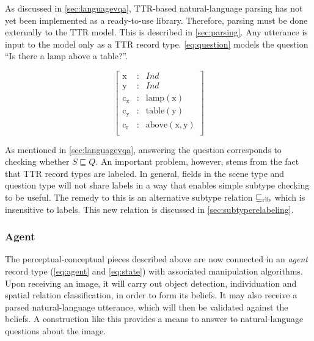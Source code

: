 
As discussed in \autoref{sec:languagevqa}, TTR-based natural-language parsing has not yet been implemented as a ready-to-use library.
Therefore, parsing must be done externally to the TTR model.
This is described in \autoref{sec:parsing}.
Any utterance is input to the model only as a TTR record type.
\autoref{eq:question} models the question ``Is there a lamp above a table?''.

\begin{equation}\label{eq:question}
\left[\begin{array}{rcl}
    \text{x} &:& Ind \\
    \text{y} &:& Ind \\
    \text{c}_\text{x} &:& \text{lamp}(\text{x}) \\
    \text{c}_\text{y} &:& \text{table}(\text{y}) \\
    \text{c}_\text{r} &:& \text{above}(\text{x}, \text{y}) \\
    \end{array}\right]
\end{equation}

As mentioned in \autoref{sec:languagevqa}, answering the question corresponds to checking whether $S \sqsubseteq Q$.
An important problem, however, stems from the fact that TTR record types are labeled.
In general, fields in the scene type and question type will not share labels in a way that enables simple subtype checking to be useful.
The remedy to this is an alternative subtype relation $\mathrel{\sqsubseteq_\text{rlb}}$ which is insensitive to labels.
This new relation is discussed in \autoref{sec:subtyperelabeling}.



\subsubsection{Agent}
\label{sec:agent}

The perceptual-conceptual pieces described above are now connected in an \textit{agent} record type (\autoref{eq:agent} and \autoref{eq:state}) with associated manipulation algorithms.
Upon receiving an image, it will carry out object detection, individuation and spatial relation classification, in order to form its beliefs.
It may also receive a parsed natural-language utterance, which will then be validated against the beliefs.
A construction like this provides a means to answer to natural-language questions about the image.

